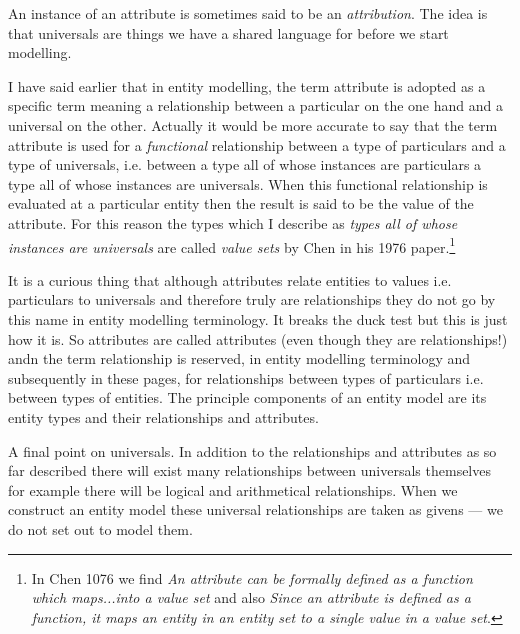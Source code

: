 An instance of an attribute is sometimes said to be an \textit{attribution}.
\mynote
The idea is that universals are things we have a shared language for before we start modelling. 
\mynote 


\mynote I have said earlier that in entity modelling, the term attribute is adopted as a specific term meaning a relationship between a particular on the one hand and a universal on the other. Actually it would be more accurate to say that the term attribute is used for a \textit{functional} relationship between a type of particulars and a type of universals,
 i.e. between a type all of whose instances are particulars a type all of whose instances are universals.
When this functional relationship is evaluated at a particular entity then the result is said to be the value of the attribute. For this reason the types which I describe as \textit{types all of whose instances are universals} are called \textit{value sets} by Chen in his  1976 paper.\footnote{
In Chen 1076 we find \textit{An attribute can be formally defined as a function which maps...into a value set} and also \textit{Since an attribute is defined as a function, it maps an entity in an entity set to a single value in a value set}.} 

\mynote
 It is a curious thing that  although attributes relate entities to  values i.e. particulars to universals
 and therefore truly are relationships they do not go by this name in entity modelling terminology. It breaks the duck test but this is just how it is.  So attributes are called attributes (even though they are relationships!) andn the term relationship is reserved, in entity modelling terminology and subsequently in these pages, for relationships between types of particulars i.e. between types of entities. 
 The principle components of an entity model are its entity types and their relationships and attributes.

\mynote A final point on universals. In addition to the relationships and attributes as so far described there will exist many relationships between universals themselves
for example there will be logical and arithmetical relationships. When we construct an entity model these universal relationships are taken as givens --- we do not set out to model them.





